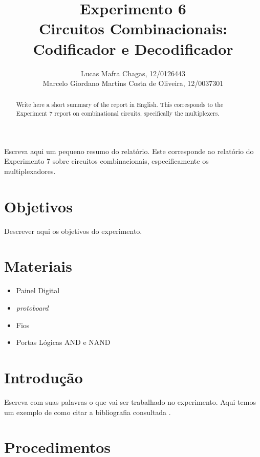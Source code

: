 \documentclass[12pt]{article}
\title{Experimento 6\\ 
	Circuitos Combinacionais: Codificador e Decodificador}
\author{
	Lucas Mafra Chagas, 12/0126443 \\
	Marcelo Giordano Martins Costa de Oliveira,  12/0037301
}
\begin{document}
 

\maketitle

 \begin{abstract}
   Write here a short summary of the report in English. This corresponds to the Experiment 7 report on combinational circuits, specifically the multiplexers.
 \end{abstract}
     
 \begin{resumo} 
  Escreva aqui um pequeno resumo do relatório. Este corresponde ao relatório do Experimento 7 sobre circuitos combinacionais, especificamente os multiplexadores.
 \end{resumo}


\section{Objetivos}
\label{sec:Objetivos}

Descrever aqui os objetivos do experimento.

\section{Materiais} 
\label{sec:Materiais}

\begin{itemize}
    \item Painel Digital
    
    \item \textit{protoboard}
    
    \item Fios
    
    \item Portas Lógicas AND e NAND
    
\end{itemize}


\section{Introdução}
\label{sec:Introducao}

Escreva com suas palavras o que vai ser trabalhado no experimento. Aqui temos um exemplo de como citar a bibliografia consultada \cite{boulic:91} \cite{smith:99}.

\section{Procedimentos}
\label{sec:Procedimentos}
\end{document}
